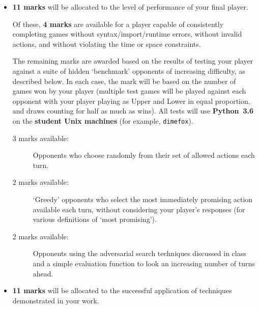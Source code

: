 \documentclass[]{article}
\begin{document}
\begin{itemize}
    \item
        \textbf{11 marks} will be allocated to the level of performance of
        your final player.

        Of these, \textbf{4 marks} are available for a player capable of
        consistently completing games
        without syntax/import/runtime errors,
        without invalid actions,
        and without violating the time or space constraints.

        The remaining marks are awarded based on the results of testing
        your player against a suite of hidden `benchmark' opponents of
        increasing difficulty, as described below.
        In each case, the mark will be based on the number of games won
        by your player (multiple test games will be played against each
        opponent with your player playing as Upper and Lower in equal
        proportion, and draws counting for half as much as wins).
        All tests will use \textbf{Python~3.6} on the \textbf{student
        Unix machines} (for example, \texttt{dimefox}\footnotemark).
  
        \begin{description}
            \item [3 marks available:]
                Opponents who choose randomly from their set of allowed
                actions each turn.
            \item [2 marks available:]
                `Greedy' opponents who select the most immediately
                promising action available each turn, without considering
                your player's responses (for various definitions of
                `most promising').
                \item [2 marks available:]
                Opponents using the adversarial search techniques
                discussed in class and a simple evaluation function
                to look an increasing number of turns ahead.
        \end{description}


    \item
        \textbf{11 marks} will be allocated to the successful application of
        techniques demonstrated in your work.


\end{itemize}
\end{document}
